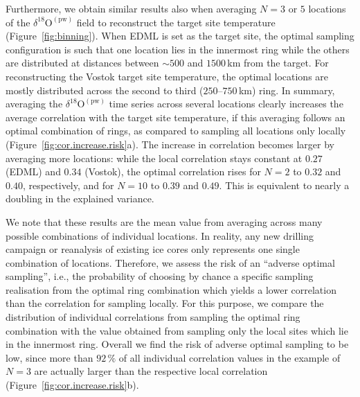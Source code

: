 \documentclass[draft]{agujournal2019}
\begin{document}
Furthermore, we obtain similar results also when averaging $N=3$ or $5$
locations of the $\delta^{18}\mathrm{O}^{\mathrm{(pw)}}$ field to reconstruct
the target site temperature (Figure~\ref{fig:binning}). When EDML is set as the
target site, the optimal sampling configuration is such that one location lies
in the innermost ring while the others are distributed at distances between
$\sim500$ and $1500$\,km from the target. For reconstructing the Vostok target
site temperature, the optimal locations are mostly distributed across the second
to third ($250$--$750$\,km) ring. In summary, averaging the
$\delta^{18}\mathrm{O}^{\mathrm{(pw)}}$ time series across several locations
clearly increases the average correlation with the target site temperature, if
this averaging follows an optimal combination of rings, as compared to sampling
all locations only locally (Figure~\ref{fig:cor.increase.risk}a). The increase in
correlation becomes larger by averaging more locations: while the local
correlation stays constant at $0.27$ (EDML) and $0.34$ (Vostok), the optimal
correlation rises for $N=2$ to $0.32$ and $0.40$, respectively, and for $N=10$
to $0.39$ and $0.49$. This is equivalent to nearly a doubling in the explained
variance.

We note that these results are the mean value from averaging across many
possible combinations of individual locations. In reality, any new drilling
campaign or reanalysis of existing ice cores only represents one single
combination of locations. Therefore, we assess the risk of an ``adverse optimal
sampling'', i.e., the probability of choosing by chance a specific sampling
realisation from the optimal ring combination which yields a lower correlation
than the correlation for sampling locally. For this purpose, we compare the
distribution of individual correlations from sampling the optimal ring
combination with the value obtained from sampling only the local sites which lie
in the innermost ring. Overall we find the risk of adverse optimal sampling to
be low, since more than $92\,\%$ of all individual correlation values in the
example of $N=3$ are actually larger than the respective local correlation
(Figure~\ref{fig:cor.increase.risk}b).
\end{document}
